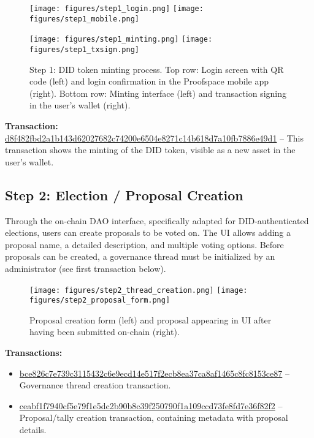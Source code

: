 \documentclass{article}
\begin{document}
\begin{figure}[H]
    \centering

    \texttt{[image: figures/step1\_login.png]}
    \hspace{3em}
    \texttt{[image: figures/step1\_mobile.png]}

    \vspace{2.5em}

    \texttt{[image: figures/step1\_minting.png]}
    \hspace{2em}
    \texttt{[image: figures/step1\_txsign.png]}
    \caption{Step 1: DID token minting process. Top row: Login screen with QR code (left) and login confirmation in the Proofspace mobile app (right).  
    Bottom row: Minting interface (left) and transaction signing in the user's wallet (right).}
\end{figure}

\noindent
\textbf{Transaction:}  
\href{https://cexplorer.io/tx/d8f482fbd2a1b143d62027682c74200e6504e8271c14b618d7a10fb7886e49d1}{d8f482fbd2a1b143d62027682c74200e6504e8271c14b618d7a10fb7886e49d1} – This transaction shows the minting of the DID token, visible as a new asset in the user's wallet.

\subsection{Step 2: Election / Proposal Creation}
Through the on-chain DAO interface, specifically adapted for DID-authenticated elections, users can create proposals to be voted on.  
The UI allows adding a proposal name, a detailed description, and multiple voting options.  
Before proposals can be created, a governance thread must be initialized by an administrator (see first transaction below).

\begin{figure}[H]
    \centering
    \texttt{[image: figures/step2\_thread\_creation.png]}
    \hfill
    \texttt{[image: figures/step2\_proposal\_form.png]}
    \caption{Proposal creation form (left) and proposal appearing in UI after having been submitted on-chain (right).}
\end{figure}

\noindent
\textbf{Transactions:}  
\begin{itemize}
    \item \href{https://cexplorer.io/tx/bce826c7e739c3115432c6e9ecd14e517f2ecb8ea37ca8af1465c8fc8153ce87}{bce826c7e739c3115432c6e9ecd14e517f2ecb8ea37ca8af1465c8fc8153ce87} – Governance thread creation transaction.  
    \item \href{https://cexplorer.io/tx/ceabf1f7940cf5e79f1e5dc2b90b8c39f250790f1a109ccd73fe8fd7e36f82f2}{ceabf1f7940cf5e79f1e5dc2b90b8c39f250790f1a109ccd73fe8fd7e36f82f2} – Proposal/tally creation transaction, containing metadata with proposal details.
\end{itemize}
\end{document}
